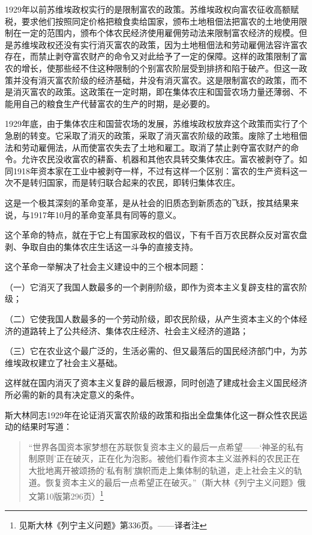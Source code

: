 1929年以前苏维埃政权实行的是限制富农的政策。苏维埃政权向富农征收高额赋税，要求他们按照同定价格把粮食卖给国家，颁布土地租佃法把富农的土地使用限制在一定的范围内，颁布个体农民经济使用雇佣劳动法来限制富农经济的规模。但是苏维埃政权还没有实行消灭富农的政策，因为土地租佃法和劳动雇佣法容许富农存在，而禁止剥夺富农财产的命令又对此给予了一定的保障。这样的政策限制了富农的增长，使那些经不住这种限制的个别富农阶层受到排挤和陷于破产。但这一政策并没有消灭富农阶级的经济基础，井没有消灭富农。这是限制富农的政策，而不是消灭富农的政策。这政策在一定时期，即在集体农庄和国营农场力量还薄弱、不能用自己的粮食生产代替富农的生产的时期，是必要的。

1929年底，由于集体农庄和国营农场的发展，苏维埃政权放弃这个政策而实行了个急剧的转变。它采取了消灭的政策，采取了消灭富农阶级的政策。废除了土地租佃法和劳动雇佣法，从而使富农失去了土地和雇工。取消了禁止剥夺富农财产的命令。允许农民没收富农的耕畜、机器和其他农具转交集体农庄。富农被剥夺了。如同1918年资本家在工业中被剥夺一样，不过有这样一个区别：富农的生产资料这一次不是转归国家，而是转归联合起来的农民，即转归集体农庄。

这是一个极其深刻的革命变革，是从社会的旧质态到新质态的飞跃，按其结果来说，与1917年10月的革命变革具有同等的意义。

这个革命的特点，就在于它上有国家政权的倡议，下有千百万农民群众反对富农盘剥、争取自由的集体农庄生话这一斗争的直接支持。

这个革命一举解决了社会主义建设中的三个根本同题：

（一）它消灭了我国人数最多的一个剥削阶级，即作为资本主义复辟支柱的富农阶级；

（二）它使我国人数最多的一个劳动阶级，即农民阶级，从产生资本主义的个体经济的道路转上了公共经济、集体农庄经济、社会主义经济的道路；

（三）它在农业这个最广泛的，生活必需的、但又最落后的国民经济部门中，为苏维埃政权建立了社会主义基础。

这样就在国内消灭了资本主义复辟的最后根源，同时创造了建成社会主义国民经济所必需的新的具有决定意义的条件。

斯大林同志1929年在论证消灭富农阶级的政策和指出全盘集体化这一群众性农民运动的结果时写道：

\begin{quotation}
“世界各国资本家梦想在苏联恢复资本主义的最后一点希望——‘神圣的私有制原则’正在破灭，正在化为泡影。被他们看作资本主义滋养料的农民正在大批地离开被颂扬的‘私有制’旗帜而走上集体制的轨道，走上社会主义的轨道。恢复资本主义的最后一点希望正在破灭。”（斯大林《列宁主义问题》俄文第10版第296页）\footnote{见斯大林《列宁主义问题》第336页。——译者注}
\end{quotation}

